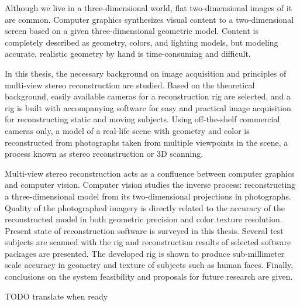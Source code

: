 \begin{abstractpage}[english]
Although we live in a three-dimensional world, flat two-dimensional images of it are common.
Computer graphics synthesizes visual content to a two-dimensional screen based on a given three-dimensional geometric model.
Content is completely described as geometry, colors, and lighting models, but modeling accurate, realistic geometry by hand is time-consuming and difficult.

In this thesis, the necessary background on image acquisition and principles of multi-view stereo reconstruction are studied.
Based on the theoretical background, easily available cameras for a reconstruction rig are selected, and a rig is built with accompanying software for easy and practical image acquisition for reconstructing static and moving subjects.
Using off-the-shelf commercial cameras only, a model of a real-life scene with geometry and color is reconstructed from photographs taken from multiple viewpoints in the scene, a process known as stereo reconstruction or 3D scanning.

Multi-view stereo reconstruction acts as a confluence between computer graphics and computer vision.
Computer vision studies the inverse process: reconstructing a three-dimensional model from its two-dimensional projections in photographs.
Quality of the photographed imagery is directly related to the accuracy of the reconstructed model in both geometric precision and color texture resolution.
Present state of reconstruction software is surveyed in this thesis.
Several test subjects are scanned with the rig and reconstruction results of selected software packages are presented.
The developed rig is shown to produce sub-millimeter scale accuracy in geometry and texture of subjects such as human faces.
Finally, conclusions on the system feasibility and proposals for future research are given.
\end{abstractpage}

\newpage

\keywords{}
\begin{abstractpage}[finnish]
	TODO translate when ready
\end{abstractpage}
